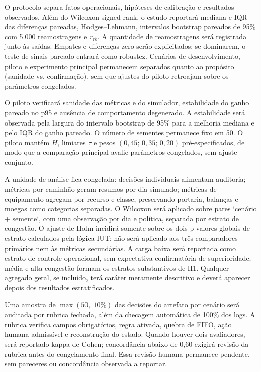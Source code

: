\documentclass[
  12pt,
  oneside,
  a4paper,
  sumario=tradicional,
  brazil
]{abntex2}
\begin{document}
O protocolo separa fatos operacionais, hip\'oteses de calibra\c{c}\~ao e resultados observados. Al\'em do Wilcoxon signed-rank, o estudo reportar\'a mediana e IQR das diferen\c{c}as pareadas, Hodges--Lehmann, intervalos bootstrap pareados de 95\% com 5.000 reamostragens e $r_{rb}$. A quantidade de reamostragens ser\'a registrada junto \`as sa\'idas. Empates e diferen\c{c}as zero ser\~ao explicitados; se dominarem, o teste de sinais pareado entrar\'a como robustez. Cen\'arios de desenvolvimento, piloto e experimento principal permanecem separados quanto ao prop\'osito (sanidade vs. confirma\c{c}\~ao), sem que ajustes do piloto retroajam sobre os par\^ametros congelados.

O piloto verificar\'a sanidade das m\'etricas e do simulador, estabilidade do ganho pareado no p95 e aus\^encia de comportamento degenerado. A estabilidade ser\'a observada pela largura do intervalo bootstrap de 95\% para a melhoria mediana e pelo IQR do ganho pareado. O n\'umero de sementes permanece fixo em 50. O piloto mant\'em $H$, limiares $\tau$ e pesos $(0{,}45;\,0{,}35;\,0{,}20)$ pr\'e-especificados, de modo que a compara\c{c}\~ao principal avalie par\^ametros congelados, sem ajuste conjunto.

A unidade de an\'alise fica congelada: decis\~oes individuais alimentam auditoria; m\'etricas por caminh\~ao geram resumos por dia simulado; m\'etricas de equipamento agregam por recurso e classe, preservando portaria, balan\c{c}as e moegas como categorias separadas. O Wilcoxon ser\'a aplicado sobre pares `cen\'ario + semente`, com uma observa\c{c}\~ao por dia e pol\'itica, separada por estrato de congest\~ao. O ajuste de Holm incidir\'a somente sobre os dois p-valores globais de estrato calculados pela l\'ogica IUT; n\~ao ser\'a aplicado aos tr\^es comparadores prim\'arios nem \`as m\'etricas secund\'arias. A carga baixa ser\'a reportada como estrato de controle operacional, sem expectativa confirmat\'oria de superioridade; m\'edia e alta congest\~ao formam os estratos substantivos de H1. Qualquer agregado geral, se inclu\'ido, ter\'a car\'ater meramente descritivo e dever\'a aparecer depois dos resultados estratificados.

Uma amostra de $\max(50,\;10\%)$ das decis\~oes do artefato por cen\'ario ser\'a auditada por rubrica fechada, al\'em da checagem autom\'atica de 100\% dos logs. A rubrica verifica campos obrigat\'orios, regra ativada, quebra de FIFO, a\c{c}\~ao humana admiss\'ivel e reconstru\c{c}\~ao do estado. Quando houver dois avaliadores, ser\'a reportado kappa de Cohen; concord\^ancia abaixo de 0,60 exigir\'a revis\~ao da rubrica antes do congelamento final. Essa revis\~ao humana permanece pendente, sem pareceres ou concord\^ancia observada a reportar.
\end{document}
